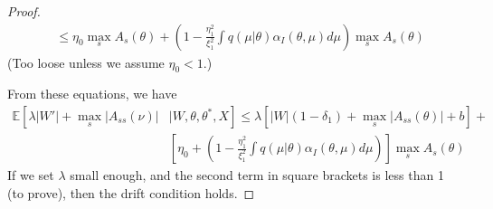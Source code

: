 \begin{proof}
\begin{align*}
   &\leq \eta_0 \max_sA_s(\theta)  + \left(1 - \frac{\eta_1^2}{\xi_1^2} \int q(\mu | \theta)\alpha_I(\theta, \mu) d\mu\right) \max_sA_s(\theta)  
\end{align*}
(Too loose unless we assume $\eta_0 < 1$.)

From these equations, we have
\begin{align*}
  \mathbb{E}\left[\lambda |W'| + \max_s |A_{ss}(\nu)|\right. & \left.| W, \theta, \theta^*, X\right] \leq 
  \lambda \left[|W|(1 - \delta_1) +  \max_s|A_{ss}(\theta)| + b\right] + \\
  &\left[\eta_0 + \left(1 - \frac{\eta_1^2}{\xi_1^2} \int q(\mu | \theta)\alpha_I(\theta, \mu) d\mu\right)\right] \max_sA_s(\theta)  
\end{align*}
If we set  $\lambda$ small enough, and the second term in square brackets is
less than 1 (to prove), then the drift condition holds.
\end{proof}
